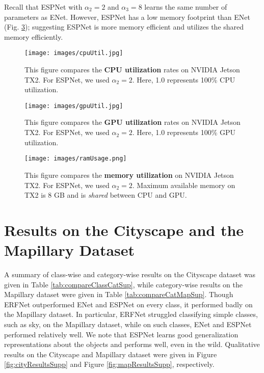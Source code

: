 \documentclass[runningheads]{llncs}
\def\Fig{Fig. }
\begin{document}
Recall that ESPNet with $\alpha_2 = 2$ and $\alpha_3=8$ learns the same number of parameters as ENet. However, ESPNet has a low memory footprint than ENet (\Fig \ref{fig:memUtilSupp}); suggesting ESPNet is more memory efficient and utilizes the shared memory efficiently.

\begin{figure}[t!]
\centering
\texttt{[image: images/cpuUtil.jpg]}
\caption{This figure compares the \textbf{CPU utilization} rates on NVIDIA Jetson TX2. For ESPNet, we used $\alpha_2 = 2$. Here, 1.0 represents 100\% CPU utilization.}
\label{fig:cpuUtilSupp}
\end{figure}

\begin{figure}[t!]
\centering
\texttt{[image: images/gpuUtil.jpg]}
\caption{This figure compares the \textbf{GPU utilization} rates on NVIDIA Jetson TX2. For ESPNet, we used $\alpha_2 = 2$. Here, 1.0 represents 100\% GPU utilization. }
\label{fig:gpuUtilSupp}
\end{figure}

\clearpage 

\begin{figure}[t!]
\centering
\texttt{[image: images/ramUsage.png]}
\caption{This figure compares the \textbf{memory utilization} on NVIDIA Jetson TX2. For ESPNet, we used $\alpha_2 = 2$. Maximum available memory on TX2 is 8 GB and is \textit{shared} between CPU and GPU.}
\label{fig:memUtilSupp}
\end{figure}


\section{Results on the Cityscape and the Mapillary Dataset}
\label{sec:resultsSup}
A summary of class-wise and category-wise results on the Cityscape \cite{cordts2016cityscapes} dataset was given in Table \ref{tab:compareClassCatSup}, while category-wise results on the Mapillary \cite{MVD2017} dataset were given in Table \ref{tab:compareCatMapSup}. Though ERFNet outperformed ENet and ESPNet on every class, it performed badly on the Mapillary dataset. In particular, ERFNet struggled classifying simple classes, such as sky, on the Mapillary dataset, while on such classes, ENet and ESPNet performed relatively well. We note that ESPNet learns good generalization representations about the objects and performs well, even in the wild. Qualitative results on the Cityscape and Mapillary dataset were given in Figure \ref{fig:cityResultsSupp} and Figure \ref{fig:mapResultsSupp}, respectively. 
\end{document}

